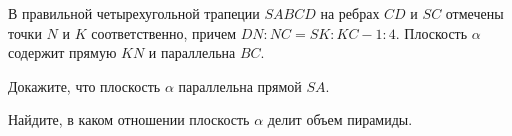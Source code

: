 \begin{ex}
	\begin{condition}
		В правильной четырехугольной трапеции \( SABCD \) на ребрах \( CD \) и \( SC \) отмечены точки \( N \) и \( K \) соответственно, причем \( DN:NC=SK:KC-1:4 \). Плоскость \( \alpha \) содержит прямую \( KN \) и параллельна \( BC \).
		\begin{enumcols}
			\item Докажите, что плоскость \( \alpha \) параллельна прямой \( SA \).
			\item Найдите, в каком отношении плоскость \( \alpha \) делит объем пирамиды.
		\end{enumcols}
	\end{condition}
\end{ex}